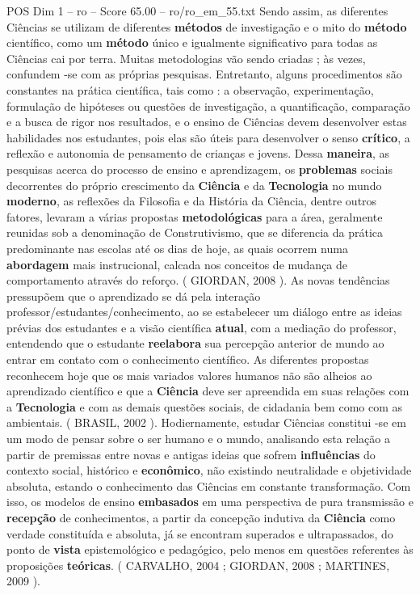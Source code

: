 \begin{textsample}{POS Dim 1 – ro – Score 65.00 – ro/ro\_em\_55.txt}
Sendo assim, as diferentes Ciências se utilizam de diferentes \textbf{métodos} de investigação e o mito do \textbf{método} científico, como um \textbf{método} único e igualmente significativo para todas as Ciências cai por terra.
Muitas metodologias vão sendo criadas ; às vezes, confundem -se com as próprias pesquisas.
Entretanto, alguns procedimentos são constantes na prática científica, tais como : a observação, experimentação, formulação de hipóteses ou questões de investigação, a quantificação, comparação e a busca de rigor nos resultados, e o ensino de Ciências devem desenvolver estas habilidades nos estudantes, pois elas são úteis para desenvolver o senso \textbf{crítico}, a reflexão e autonomia de pensamento de crianças e jovens.
Dessa \textbf{maneira}, as pesquisas acerca do processo de ensino e aprendizagem, os \textbf{problemas} sociais decorrentes do próprio crescimento da \textbf{Ciência} e da \textbf{Tecnologia} no mundo \textbf{moderno}, as reflexões da Filosofia e da História da Ciência, dentre outros fatores, levaram a várias propostas \textbf{metodológicas} para a área, geralmente reunidas sob a denominação de Construtivismo, que se diferencia da prática predominante nas escolas até os dias de hoje, as quais ocorrem numa \textbf{abordagem} mais instrucional, calcada nos conceitos de mudança de comportamento através do reforço. ( GIORDAN, 2008 ).
As novas tendências pressupõem que o aprendizado se dá pela interação professor/estudantes/conhecimento, ao se estabelecer um diálogo entre as ideias prévias dos estudantes e a visão científica \textbf{atual}, com a mediação do professor, entendendo que o estudante \textbf{reelabora} sua percepção anterior de mundo ao entrar em contato com o conhecimento científico.
As diferentes propostas reconhecem hoje que os mais variados valores humanos não são alheios ao aprendizado científico e que a \textbf{Ciência} deve ser apreendida em suas relações com a \textbf{Tecnologia} e com as demais questões sociais, de cidadania bem como com as ambientais. ( BRASIL, 2002 ).
Hodiernamente, estudar Ciências constitui -se em um modo de pensar sobre o ser humano e o mundo, analisando esta relação a partir de premissas entre novas e antigas ideias que sofrem \textbf{influências} do contexto social, histórico e \textbf{econômico}, não existindo neutralidade e objetividade absoluta, estando o conhecimento das Ciências em constante transformação.
Com isso, os modelos de ensino \textbf{embasados} em uma perspectiva de pura transmissão e \textbf{recepção} de conhecimentos, a partir da concepção indutiva da \textbf{Ciência} como verdade constituída e absoluta, já se encontram superados e ultrapassados, do ponto de \textbf{vista} epistemológico e pedagógico, pelo menos em questões referentes às proposições \textbf{teóricas}. ( CARVALHO, 2004 ; GIORDAN, 2008 ; MARTINES, 2009 ).

\end{textsample}
